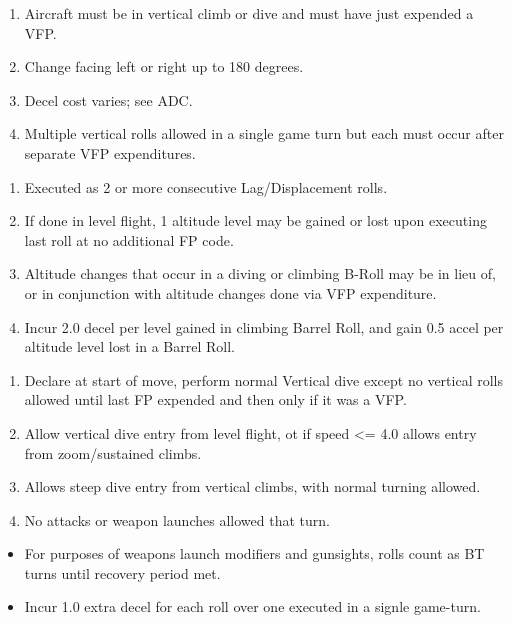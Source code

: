 \begin{table*}
\begin{multicols}{2}

\begin{enumerate}[nosep]
    \item Aircraft must be in vertical climb or dive and must have just expended a VFP.
    \item Change facing left or right up to 180 degrees.
    \item Decel cost varies; see ADC.
    \item Multiple vertical rolls allowed in a single game turn but each must occur after separate VFP expenditures.
\end{enumerate}


\begin{enumerate}[nosep]
    \item Executed as 2 or more consecutive Lag/Displacement rolls.
    \item If done in level flight, 1 altitude level may be gained or lost upon executing last roll at no additional FP code.
    \item Altitude changes that occur in a diving or climbing B-Roll may be in lieu of, or in conjunction with altitude changes done via VFP expenditure.
    \item Incur 2.0 decel per level gained in climbing Barrel Roll, and gain 0.5 accel per altitude level lost in a Barrel Roll.
\end{enumerate}


\begin{enumerate}[nosep]
    \item Declare at start of move, perform normal Vertical dive except no vertical rolls allowed until last FP expended and then only if it was a VFP.
    \item Allow vertical dive entry from level flight, ot if speed <= 4.0 allows entry from zoom/sustained climbs.
    \item Allows steep dive entry from vertical climbs, with normal turning allowed.
    \item No attacks or weapon launches allowed that turn.
\end{enumerate}

\begin{itemize}[nosep]
    \item For purposes of weapons launch modifiers and gunsights, rolls count as BT turns until recovery period met.
    \item Incur 1.0 extra decel for each roll over one executed in a signle game-turn.
\end{itemize}


\end{multicols}
\end{table*}
